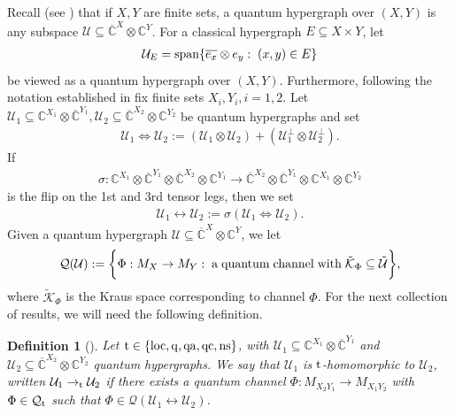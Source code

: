 \documentclass[11pt]{amsart}
\newtheorem{definition}[theorem]{Definition}
\newcommand{\cl}[1]{\mathcal{#1}}
\newcommand{\bb}[1]{\mathbb{#1}}
\begin{document}
Recall (see \cite[Definition 4.1]{gt_two}) that if $X, Y$ are finite sets, a quantum hypergraph over $(X, Y)$ is any subspace $\cl{U} \subseteq \overline{\bb{C}}^{X}\otimes \bb{C}^{Y}$. For a classical hypergraph $E \subseteq X\times Y$, let
\begin{gather*}
	\cl{U}_{E} = {\rm span}\{\overline{e_{x}}\otimes e_{y}: \; (x, y) \in E\}
\end{gather*}
\noindent be viewed as a quantum hypergraph over $(X, Y)$. Furthermore, following the notation established in \cite{gt_two} fix finite sets $X_{i}, Y_{i}, i = 1, 2$. Let $\cl{U}_{1} \subseteq \bb{C}^{X_{1}}\otimes \overline{\bb{C}}^{Y_{1}}, \cl{U}_{2} \subseteq \overline{\bb{C}}^{X_{2}}\otimes \bb{C}^{Y_{2}}$ be quantum hypergraphs and set
\begin{gather*}
	\cl{U}_{1} \Leftrightarrow \cl{U}_{2} := (\cl{U}_{1}\otimes \cl{U}_{2})+(\cl{U}_{1}^{\perp}\otimes \cl{U}_{2}^{\perp}).
\end{gather*}
\noindent If 
\begin{gather*}
	\sigma: \bb{C}^{X_{1}}\otimes \overline{\bb{C}}^{Y_{1}}\otimes \overline{\bb{C}}^{X_{2}}\otimes \bb{C}^{Y_{1}}\rightarrow \overline{\bb{C}}^{X_{2}}\otimes \overline{\bb{C}}^{Y_{1}}\otimes \bb{C}^{X_{1}}\otimes \bb{C}^{Y_{2}}
\end{gather*}
\noindent is the flip on the 1st and 3rd tensor legs, then we set
\begin{gather*}
	\cl{U}_{1} \leftrightarrow \cl{U}_{2} := \sigma(\cl{U}_{1} \Leftrightarrow \cl{U}_{2}).
\end{gather*}
\noindent Given a quantum hypergraph $\cl{U} \subseteq \overline{\bb{C}}^{X}\otimes \bb{C}^{Y}$, we let
\begin{gather*}
	\cl{Q}(\cl{U}) := \bigg\{\Phi: M_{X}\rightarrow M_{Y}: \; {\rm a \; quantum \; channel \; with \;} \tilde{\cl{K}}_{\Phi} \subseteq \tilde{\cl{U}}\bigg\},
\end{gather*}
\noindent where $\tilde{\cl{K}}_{\Phi}$ is the Kraus space corresponding to channel $\Phi$. For the next collection of results, we will need the following definition.
\begin{definition}[\cite{gt_two}]
Let ${\rm t} \in \{\rm loc, q, qa, qc, ns\}$, with $\cl{U}_{1} \subseteq \bb{C}^{X_{1}}\otimes \overline{\bb{C}}^{Y_{1}}$ and $\cl{U}_{2} \subseteq \overline{\bb{C}}^{X_{2}}\otimes \bb{C}^{Y_{2}}$ quantum hypergraphs. We say that $\cl{U}_{1}$ is ${\rm t}$-homomorphic to $\cl{U}_{2}$, written $\cl{U}_{1}\rightarrow_{\rm t} \cl{U}_{2}$ if there exists a quantum channel $\Phi: M_{X_{2}Y_{1}}\rightarrow M_{X_{1}Y_{2}}$ with $\Phi \in \cl{Q}_{\rm t}$ such that $\Phi \in \cl{Q}(\cl{U}_{1}\leftrightarrow \cl{U}_{2})$. 
\end{definition}
\end{document}
